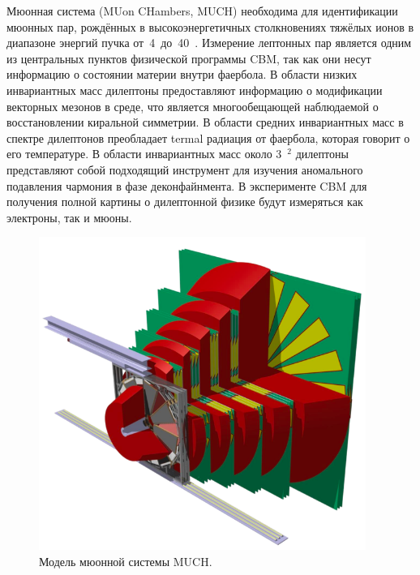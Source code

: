 \begin{minipage}[b]{0.495\textwidth}
Мюонная система (MUon CHambers, MUCH) необходима для идентификации мюонных пар, рождённых в высокоэнергетичных столкновениях тяжёлых ионов в диапазоне энергий пучка от~4~до~40~\GeVperNucl. Измерение лептонных пар является одним из центральных пунктов физической программы CBM, так как они несут информацию о состоянии материи внутри фаербола. В области низких инвариантных масс дилептоны предоставляют информацию о модификации векторных мезонов в среде, что является многообещающей наблюдаемой о восстановлении киральной симметрии. В области средних инвариантных масс в спектре дилептонов преобладает termal \todo радиация от фаербола, которая говорит о его температуре. В области инвариантных масс около 3~\GeVoverC$^{2}$ дилептоны представляют собой подходящий инструмент для изучения аномального подавления чармония в фазе деконфайнмента. В эксперименте CBM для получения полной картины о дилептонной физике будут измеряться как электроны, так и мюоны.
\end{minipage}
\begin{minipage}[b]{0.495\textwidth}
\begin{figure}[H]
\includegraphics[width=0.95\textwidth]{pictures/CBM_MUCH_model.png}
\caption{Модель мюонной системы MUCH.}
\label{fig:MUCH2}
\end{figure}
\end{minipage}

